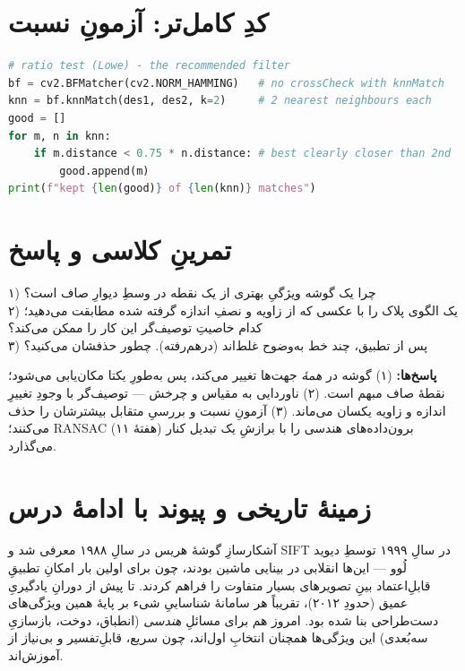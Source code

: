 \documentclass[12pt]{article}
\begin{document}
\section{کدِ کامل‌تر: آزمونِ نسبت}

\begin{ltrcode}
\begin{lstlisting}[language=Python]
# ratio test (Lowe) - the recommended filter
bf = cv2.BFMatcher(cv2.NORM_HAMMING)   # no crossCheck with knnMatch
knn = bf.knnMatch(des1, des2, k=2)     # 2 nearest neighbours each
good = []
for m, n in knn:
    if m.distance < 0.75 * n.distance: # best clearly closer than 2nd
        good.append(m)
print(f"kept {len(good)} of {len(knn)} matches")
\end{lstlisting}
\end{ltrcode}

\section{تمرینِ کلاسی و پاسخ}

\begin{tamrin}
۱) چرا یک گوشه ویژگیِ بهتری از یک نقطه در وسطِ دیوارِ صاف است؟\\
۲) یک الگوی پلاک را با عکسی که از زاویه و نصفِ اندازه گرفته شده مطابقت می‌دهید؛ کدام خاصیتِ توصیف‌گر این کار را ممکن می‌کند؟\\
۳) پس از تطبیق، چند خط به‌وضوح غلط‌اند (درهم‌رفته). چطور حذفشان می‌کنید؟
\end{tamrin}

\textbf{پاسخ‌ها:} (۱) گوشه در \emph{همهٔ} جهت‌ها تغییر می‌کند، پس به‌طورِ یکتا مکان‌یابی می‌شود؛ نقطهٔ صاف مبهم است. (۲) ناوردایی به مقیاس و چرخش — توصیف‌گر با وجودِ تغییرِ اندازه و زاویه یکسان می‌ماند. (۳) آزمونِ نسبت و بررسیِ متقابل بیشترشان را حذف می‌کنند؛ RANSAC (هفتهٔ ۱۱) برون‌داده‌های هندسی را با برازشِ یک تبدیل کنار می‌گذارد.

\section{زمینهٔ تاریخی و پیوند با ادامهٔ درس}

آشکارسازِ گوشهٔ هریس در سالِ ۱۹۸۸ معرفی شد و SIFT در سالِ ۱۹۹۹ توسطِ دیوید لُوو — این‌ها انقلابی در بینایی ماشین بودند، چون برای اولین بار امکانِ تطبیقِ قابلِ‌اعتماد بینِ تصویرهای بسیار متفاوت را فراهم کردند. تا پیش از دورانِ یادگیریِ عمیق (حدودِ ۲۰۱۲)، تقریباً هر سامانهٔ شناساییِ شیء بر پایهٔ همین ویژگی‌های دست‌طراحی بنا شده بود. امروز هم برای مسائلِ \emph{هندسی} (انطباق، دوخت، بازسازیِ سه‌بُعدی) این ویژگی‌ها همچنان انتخابِ اول‌اند، چون سریع، قابلِ‌تفسیر و بی‌نیاز از آموزش‌اند.
\end{document}
